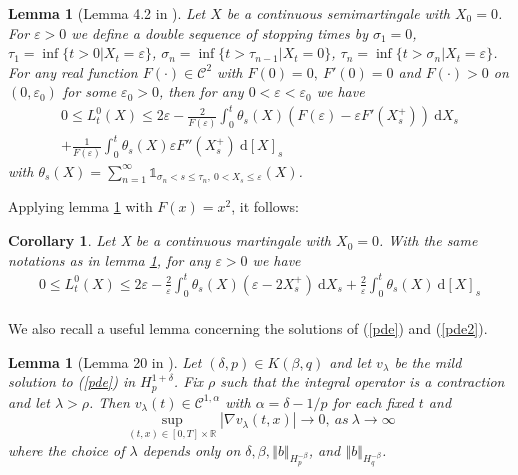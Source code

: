 \documentclass{article}[12pt]
\newtheorem{lem}[theo]{Lemma}
\newtheorem{cor}[theo]{Corollary}
\newcommand{\norme}[1]{\left\Vert #1\right\Vert}
\newcommand{\R}{\mathbb{R}}
\newcommand{\di}{\mathrm{d}}
\begin{document}
        \begin{lem}[Lemma 4.2 in \cite{Yan}]\label{local}
            Let $X$ be a continuous semimartingale with $X_0 = 0$. For $\varepsilon>0$ we define a double sequence of stopping times by $\sigma_1 = 0$, $\tau_1=\inf\{t>0 | X_t=\varepsilon\}$, $\sigma_n = \inf\{t>\tau_{n-1}|X_t=0\}$, $\tau_n=\inf\{t>\sigma_n|X_t=\varepsilon\}$. For any real function $F(\cdot)\in\mathcal{C}^2$ with $F(0)=0,\ F'(0) = 0$ and $F(\cdot) > 0$ on $(0,\varepsilon_0)$ for some $\varepsilon_0 > 0$, then for any $0<\varepsilon<\varepsilon_0$ we have
            \begin{multline*}
                0\leq L^0_t(X) \leq 2\varepsilon - \frac{2}{F(\varepsilon)}\int_0^t \theta_s(X) \left(F\left(\varepsilon\right) - \varepsilon F'\left(X_s^+\right)\right)\ \di X_s\\
                +\frac{1}{F(\varepsilon)}\int_0^t \theta_s(X)\varepsilon F''(X_s^+)\ \di[X]_s
            \end{multline*}
            with $\theta_s(X) = \sum_{n=1}^\infty \mathds{1}_{\sigma_n< s\leq \tau_n,\ 0<X_s\leq \varepsilon}(X)$.
        \end{lem}
        
        Applying lemma \ref{local} with $F(x) = x^2$, it follows:
        \begin{cor}
            Let X be a continuous martingale with $X_0 = 0$. With the same notations as in lemma \ref{local}, for any $\varepsilon>0$ we have
            \begin{multline}
                0\leq L^0_t(X) \leq 2\varepsilon - \frac{2}{\varepsilon}\int_0^t \theta_s(X) \left(\varepsilon - 2{X_s^+}\right)\ \di X_s
                +\frac{2}{\varepsilon}\int_0^t \theta_s(X) \ \di[X]_s
            \end{multline}
        \end{cor}
        
        \paragraph{}              
        We also recall a useful lemma concerning the solutions of (\ref{pde}) and (\ref{pde2}).
        
        \begin{lem}[Lemma 20 in \cite{Fla-Iss-Rus-2017}]\label{lem}
            Let $(\delta,p)\in K(\beta,q)$ and let $v_\lambda$ be the mild solution to (\ref{pde}) in $H_p^{1+\delta}$. Fix $\rho$ such that the integral operator is a contraction and let $\lambda>\rho$. Then $v_\lambda(t)\in\mathcal{C}^{1,\alpha}$ with $\alpha=\delta-1/p$ for each fixed $t$ and 
            \begin{equation*}
            \underset{(t,x)\in[0,T]\times\R}{\sup} |\nabla v_\lambda(t,x)| \rightarrow 0,\ as\ \lambda \rightarrow \infty
            \end{equation*}
            where the choice of $\lambda$ depends only on $\delta,\beta,\norme{b}_{H_p^{-\beta}}$, and $\norme{b}_{H_q^{-\beta}}$.
        \end{lem}
         
\end{document}
